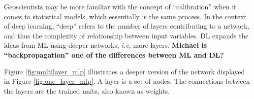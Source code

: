 
Geoscientists may be more familiar with the concept of ``calibration'' when it comes to statistical models, which essentially is the same process. In the context of deep learning, ``deep'' refers to the number of layers contributing to a network, and thus the complexity of relationship between input variables. DL expands the ideas from ML using deeper networks, \textit{i.e,} more layers.
\textbf{Michael is ``backpropagation'' one of the differences between ML and DL?}


Figure \ref{fig:multilayer_mlp} illustrates a deeper version of the network displayed in Figure \ref{fig:one_layer_mlp}. A layer is a set of nodes. The connections between the layers are the trained units, also known as weights. 

